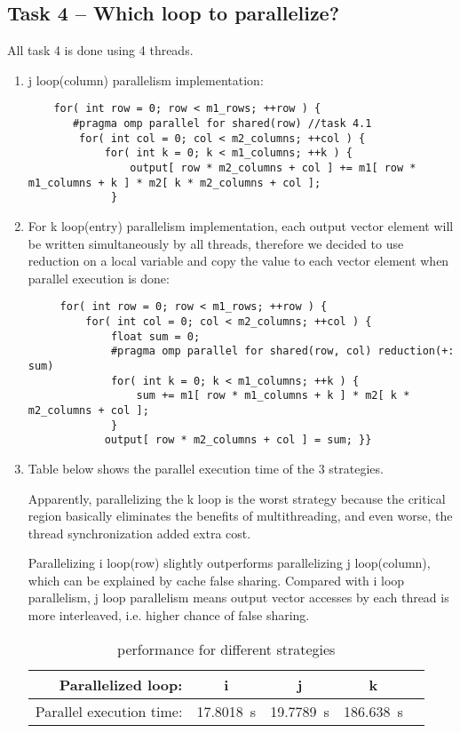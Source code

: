 \documentclass[a4paper, DIV12, headsepline]{scrartcl}
\begin{document}
\subsection*{Task 4 -- Which loop to parallelize?}
All task 4 is done using 4 threads.
\begin{enumerate}
\item  j loop(column) parallelism implementation:
\begin{verbatim}
    for( int row = 0; row < m1_rows; ++row ) {
       #pragma omp parallel for shared(row) //task 4.1
        for( int col = 0; col < m2_columns; ++col ) {
            for( int k = 0; k < m1_columns; ++k ) {
                output[ row * m2_columns + col ] += m1[ row * m1_columns + k ] * m2[ k * m2_columns + col ];
             }
\end{verbatim}

\item For k loop(entry) parallelism implementation,  each output vector element will be written simultaneously by all threads, therefore we decided to use reduction on a local variable and copy the value to each vector element  when parallel execution is done:
\begin{verbatim}
     for( int row = 0; row < m1_rows; ++row ) {
         for( int col = 0; col < m2_columns; ++col ) {
             float sum = 0;
             #pragma omp parallel for shared(row, col) reduction(+: sum)
             for( int k = 0; k < m1_columns; ++k ) {
                 sum += m1[ row * m1_columns + k ] * m2[ k * m2_columns + col ];
             }
            output[ row * m2_columns + col ] = sum; }}
\end{verbatim}
\item Table below shows the parallel execution time of the 3 strategies.

Apparently, parallelizing  the k loop is the worst strategy because the critical region basically eliminates the benefits of multithreading, and even worse, the thread synchronization added extra cost.

Parallelizing i loop(row)  slightly outperforms parallelizing j loop(column), which can be explained by cache false sharing. Compared with i loop parallelism, j loop parallelism means output vector accesses by each thread is more interleaved, i.e. higher chance of false sharing.
\begin{table}[htbp]
\centering
{}
\begin{tabular}{rSSSS}
\hline
Parallelized loop: & {i} & {j} & {k} \\
\hline
Parallel execution time: & \SI{17.8018}{s} & \SI{19.7789}{s} & \SI{186.638}{s}  \\
\hline
\end{tabular}
\caption{performance for different strategies}
\label{tab:tab43}
\end{table}
\end{enumerate}
\end{document}
